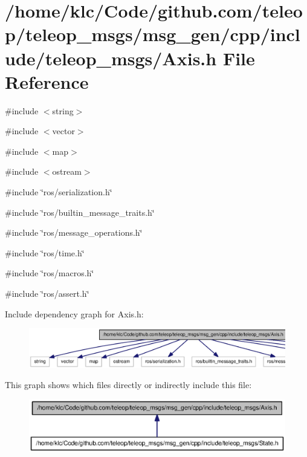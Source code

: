\section{/home/klc/Code/github.com/teleop/teleop\_\-msgs/msg\_\-gen/cpp/include/teleop\_\-msgs/Axis.h File Reference}
\label{Axis_8h}
{\ttfamily \#include $<$string$>$}\par
{\ttfamily \#include $<$vector$>$}\par
{\ttfamily \#include $<$map$>$}\par
{\ttfamily \#include $<$ostream$>$}\par
{\ttfamily \#include \char`\"{}ros/serialization.h\char`\"{}}\par
{\ttfamily \#include \char`\"{}ros/builtin\_\-message\_\-traits.h\char`\"{}}\par
{\ttfamily \#include \char`\"{}ros/message\_\-operations.h\char`\"{}}\par
{\ttfamily \#include \char`\"{}ros/time.h\char`\"{}}\par
{\ttfamily \#include \char`\"{}ros/macros.h\char`\"{}}\par
{\ttfamily \#include \char`\"{}ros/assert.h\char`\"{}}\par
Include dependency graph for Axis.h:
\nopagebreak
\begin{figure}[H]
\begin{center}
\leavevmode
\includegraphics[width=400pt]{Axis_8h__incl}
\end{center}
\end{figure}
This graph shows which files directly or indirectly include this file:
\nopagebreak
\begin{figure}[H]
\begin{center}
\leavevmode
\includegraphics[width=400pt]{Axis_8h__dep__incl}
\end{center}
\end{figure}

